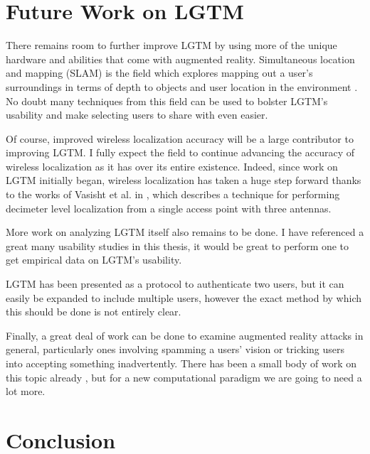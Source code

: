 \documentclass[12pt]{report}
\begin{document}
\section{Future Work on LGTM}
There remains room to further improve LGTM by using more of the unique hardware and abilities that come with augmented reality. Simultaneous location and mapping (SLAM) is the field which explores mapping out a user's surroundings in terms of depth to objects and user location in the environment \cite{ParallelTrackingAndMappingKlein2007,MonoSlamDavison2007,VisualIntertialOdometryNonlinearLeutenegger2014,ProjectTangoWebsite,SlamPart1Durrant-Whyte2006}. No doubt many techniques from this field can be used to bolster LGTM's usability and make selecting users to share with even easier. \par

Of course, improved wireless localization accuracy will be a large contributor to improving LGTM. I fully expect the field to continue advancing the accuracy of wireless localization as it has over its entire existence. Indeed, since work on LGTM initially began, wireless localization has taken a huge step forward thanks to the works of Vasisht et al. in \cite{ChronosSingleAPLocalizationVasisht2016}, which describes a technique for performing decimeter level localization from a single access point with three antennas. \par

More work on analyzing LGTM itself also remains to be done. I have referenced a great many usability studies in this thesis, it would be great to perform one to get empirical data on LGTM's usability. \par

LGTM has been presented as a protocol to authenticate two users, but it can easily be expanded to include multiple users, however the exact method by which this should be done is not entirely clear. \par

Finally, a great deal of work can be done to examine augmented reality attacks in general, particularly ones involving spamming a users' vision or tricking users into accepting something inadvertently. There has been a small body of work on this topic already \cite{SafelyAugmentLebeck2016,SecurityAndPrivacyForARRoesner2014}, but for a new computational paradigm we are going to need a lot more. \par


\section{Conclusion}
 \par
\end{document}
